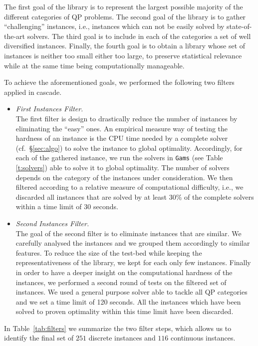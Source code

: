 The first goal of the library is to represent the largest possible majority of
the different categories of QP problems.
The second goal of the library is to gather ``challenging'' instances,
i.e., instances which can not be easily solved by  state-of-the-art
solvers.
The third goal is to include in each of the categories a set of well
diversified instances.
Finally, the fourth goal is to obtain a library whose set of instances
is neither too small either too large, to preserve statistical
relevance while at the same time being computationally manageable.

To achieve the aforementioned goals, we performed the following two
filters applied in cascade.

\begin{itemize}

\item \emph{First Instances Filter.}\\
The first filter is design to drastically reduce the number of
instances by eliminating the ``easy'' ones. An empirical measure way
of testing the hardness of an instance is the CPU time needed by a
complete solver (cf.~\S \ref{sec:algo}) to solve the instance to
global optimality.
Accordingly, for each of the gathered instance, we run the solvers in
{\tt Gams} (see Table \ref{t:solvers}) able to solve it to global optimality.
The number of solvers depends on the category of the instances under
consideration.
We then filtered according to a relative measure of computational
difficulty, i.e., we discarded all instances that are solved by at
least 30\% of the complete solvers within a time limit of 30 seconds.

\item \emph{Second Instances Filter.}\\
The goal of the second filter is to eliminate instances that are similar.
We carefully analysed the instances and we grouped them accordingly to
similar features. To reduce the size of the test-bed
while keeping the representativeness of the library,   we kept for
each only few instances.
Finally in order to have a deeper insight on the computational hardness of the
instances, we performed a second round of tests on the filtered set of
instances.  We used a general purpose solver able to tackle all QP categories and we set a time limit of 120 seconds. 
All the instances which have been solved to
proven optimality within this time limit have been discarded.
\end{itemize}
In Table~\ref{tab:filters} we summarize the two filter steps, which
allows us to identify the final set of $251$ discrete instances and
$116$ continuous instances.








